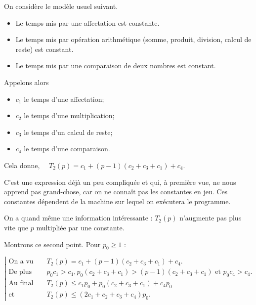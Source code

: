 On considère le modèle usuel suivant.

\begin{itemize}
\item Le temps mis par une affectation est constante.
\item Le temps mis par opération arithmétique (somme, produit,
  division, calcul de reste) est constant.
\item Le temps mis par une comparaison de deux nombres est constant.
\end{itemize}

Appelons alors
\begin{itemize}
\item $c_{1}$ le temps d'une affectation;
\item $c_{2}$ le temps d'une multiplication;
\item $c_{3}$ le temps d'un calcul de reste;
\item $c_{4}$ le temps d'une comparaison.
\end{itemize}

Cela donne,
$ \quad   T_{2}(p) = c_{1} + (p-1) (c_{2} + c_{3} + c_{1}) + c_{4}$.


C'est une expression déjà un peu compliquée et qui, à première vue,  ne nous apprend pas grand-chose, car on ne  connaît pas les constantes en jeu.
Ces constantes dépendent de la machine sur lequel on  exécutera le programme. 

On a quand même une information intéressante : $T_{2}(p)$ n'augmente pas plus vite que $p$ multipliée par une constante.

%
%  
  
Montrons ce second point. Pour $p_0\geq 1$ :
 
$ \left |\begin{array}{ll}
\text{On a vu que } & T_{2}(p) = c_{1} + (p-1) (c_{2} + c_{3} + c_{1}) + c_{4}. \\
\text{De plus} & p_0c_{1}> c_{1}, p_0 (c_{2} + c_{3} + c_{1}) > (p-1) (c_{2} + c_{3} + c_{1}) \text{ et  } p_0c_{4}>c_4. \\
\text{Au final }&    T_{2}(p) \leq c_{1}p_0 + p_0(c_{2}+c_{3}+c_{1})+c_{4}p_0\\
\text{et }  & T_{2}(p)\leq (2c_{1}+c_{2}+c_{3}+c_{4})p_0.
  \end{array}\right.$
  

